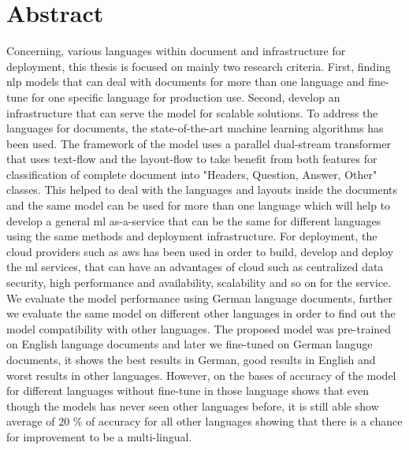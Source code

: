 \chapter*{Abstract}
\large
 
 Concerning, various languages within document and infrastructure for deployment, this thesis is focused on mainly two research criteria. First, finding \acrfull{nlp} models that can deal with documents for more than one language and fine-tune for one specific language for production use. Second, develop an infrastructure that can serve the model for scalable solutions. To address the languages for documents, the state-of-the-art machine learning algorithms has been used. The framework of the model uses a parallel dual-stream transformer that uses text-flow and the layout-flow to take benefit from both features for classification of complete document into "Headers, Question, Answer, Other" classes. This helped to deal with the languages and layouts inside the documents and the same model can be used for more than one language which will help to develop a general \acrshort{ml} as-a-service that can be the same for different languages using the same methods and deployment infrastructure. For deployment, the cloud providers such as \acrshort{aws} has been used in order to build, develop and deploy the \acrshort{ml} services, that can have an advantages of cloud such as centralized data security, high performance and availability, scalability and so on for the service. We evaluate the model performance using German language documents, further we evaluate the same model on different other languages in order to find out the model compatibility with other languages. The proposed model was pre-trained on English language documents and later we fine-tuned on German languge documents, it shows the best results in German, good results in English and worst results in other languages. However, on the bases of accuracy of the model for different languages without fine-tune in those language shows that even though the models has never seen other languages before, it is still able show average of 20 \% of accuracy for all other languages showing that there is a chance for improvement to be a multi-lingual.
 
